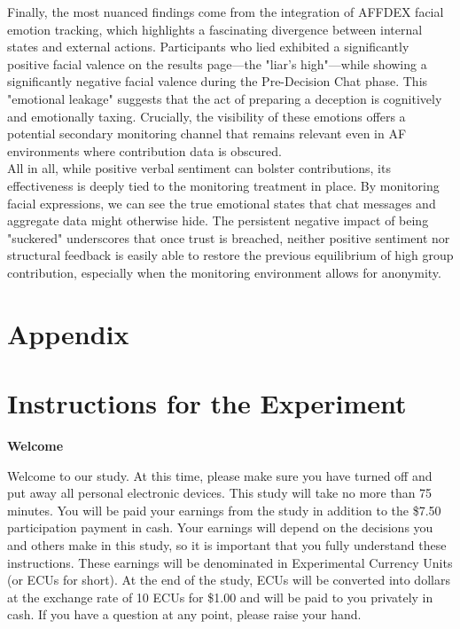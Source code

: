 \documentclass[12pt,letterpaper,english]{article}
\begin{document}
Finally, the most nuanced findings come from the integration of AFFDEX facial emotion tracking, which highlights a fascinating divergence between internal states and external actions. Participants who lied exhibited a significantly positive facial valence on the results page—the "liar's high"—while showing a significantly negative facial valence during the Pre-Decision Chat phase. This "emotional leakage" suggests that the act of preparing a deception is cognitively and emotionally taxing. Crucially, the visibility of these emotions offers a potential secondary monitoring channel that remains relevant even in AF environments where contribution data is obscured.\\
All in all, while positive verbal sentiment can bolster contributions, its effectiveness is deeply tied to the monitoring treatment in place. By monitoring facial expressions, we can see the true emotional states that chat messages and aggregate data might otherwise hide. The persistent negative impact of being "suckered" underscores that once trust is breached, neither positive sentiment nor structural feedback is easily able to restore the previous equilibrium of high group contribution, especially when the monitoring environment allows for anonymity.
\clearpage



\newpage
\appendix
\section*{Appendix}
\section{Instructions for the Experiment}
\begin{center}
\textbf{Welcome}\\
\end{center}
Welcome to our study. At this time, please make sure you have turned off and put away all personal electronic devices. This study will take no more than 75 minutes. You will be paid your earnings from the study in addition to the \$7.50 participation payment in cash. Your earnings will depend on the decisions you and others make in this study, so it is important that you fully understand these instructions. These earnings will be denominated in Experimental Currency Units (or ECUs for short). At the end of the study, ECUs will be converted into dollars at the exchange rate of 10 ECUs for \$1.00 and will be paid to you privately in cash. If you have a question at any point, please raise your hand.\\
\end{document}
